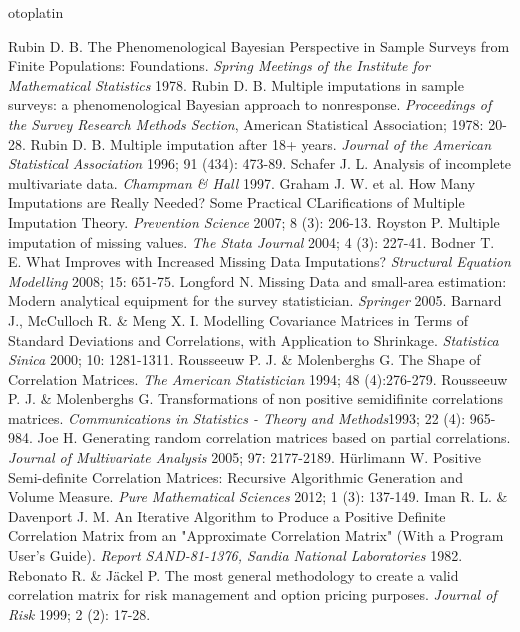 otoplatin\documentclass[a4paper,openright,12pt]{report}
\begin{document}
\begin{thebibliography}{99}
 Rubin D. B. The Phenomenological Bayesian Perspective in Sample Surveys from Finite Populations: Foundations. \textit{Spring Meetings of the Institute for Mathematical Statistics} 1978. 
 Rubin D. B. Multiple imputations in sample surveys: a phenomenological Bayesian approach to nonresponse. \textit{Proceedings of the Survey Research Methods Section}, American Statistical Association; 1978: 20-28. 
 Rubin D. B. Multiple imputation after 18+ years. \textit{Journal of the American Statistical Association} 1996; 91 (434): 473-89.
 Schafer J. L. Analysis of incomplete multivariate data. \textit{Champman \& Hall} 1997.
 Graham J. W. et al. How Many Imputations are Really Needed? Some Practical CLarifications of Multiple Imputation Theory. \textit{Prevention Science} 2007; 8 (3): 206-13.
 Royston P. Multiple imputation of missing values. \textit{The Stata Journal} 2004; 4 (3): 227-41.
 Bodner T. E. What Improves with Increased Missing Data Imputations? \textit{Structural Equation Modelling} 2008; 15: 651-75.
 Longford N. Missing Data and small-area estimation: Modern analytical equipment for the survey statistician. \textit{Springer} 2005.
 Barnard J., McCulloch R. \& Meng X. I. Modelling Covariance Matrices in Terms of Standard Deviations and Correlations, with Application to Shrinkage. \textit{Statistica Sinica} 2000; 10: 1281-1311.
 Rousseeuw P. J. \& Molenberghs G. The Shape of Correlation Matrices. \textit{The American Statistician} 1994; 48 (4):276-279.
 Rousseeuw P. J. \& Molenberghs G. Transformations of non positive semidifinite correlations matrices. \textit{Communications in Statistics - Theory and Methods}1993; 22 (4): 965-984.
 Joe H. Generating random correlation matrices based on partial correlations. \textit{Journal of Multivariate Analysis} 2005; 97: 2177-2189.
 Hürlimann W. Positive Semi-definite Correlation Matrices: Recursive Algorithmic Generation and Volume Measure. \textit{Pure Mathematical Sciences} 2012; 1 (3): 137-149.
 Iman R. L. \& Davenport J. M. An Iterative Algorithm to Produce a Positive Definite Correlation Matrix from an "Approximate Correlation Matrix" (With a Program User's Guide). \textit{Report SAND-81-1376, Sandia National Laboratories} 1982.
 Rebonato R. \& Jäckel P. The most general methodology to create a valid correlation matrix for risk management and option pricing purposes. \textit{Journal of Risk} 1999; 2 (2): 17-28.

\end{thebibliography}
\end{document}
